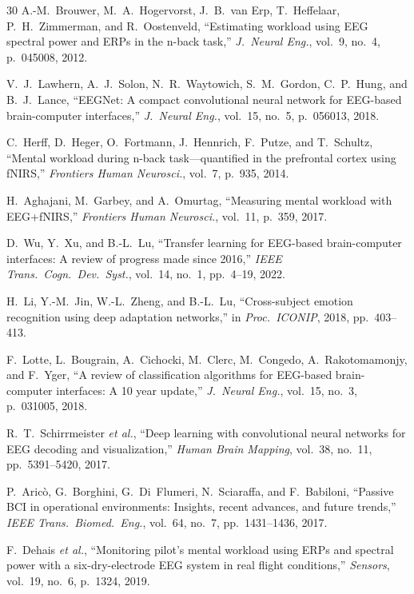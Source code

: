 \documentclass[conference]{IEEEtran}
\begin{document}
\begin{thebibliography}{30}
A.-M.~Brouwer, M.~A.~Hogervorst, J.~B.~van Erp, T.~Heffelaar, P.~H.~Zimmerman, and R.~Oostenveld, ``Estimating workload using EEG spectral power and ERPs in the n-back task,'' \emph{J.\ Neural Eng.}, vol.~9, no.~4, p.~045008, 2012.

V.~J.~Lawhern, A.~J.~Solon, N.~R.~Waytowich, S.~M.~Gordon, C.~P.~Hung, and B.~J.~Lance, ``EEGNet: A compact convolutional neural network for EEG-based brain-computer interfaces,'' \emph{J.\ Neural Eng.}, vol.~15, no.~5, p.~056013, 2018.

C.~Herff, D.~Heger, O.~Fortmann, J.~Hennrich, F.~Putze, and T.~Schultz, ``Mental workload during n-back task---quantified in the prefrontal cortex using fNIRS,'' \emph{Frontiers Human Neurosci.}, vol.~7, p.~935, 2014.

H.~Aghajani, M.~Garbey, and A.~Omurtag, ``Measuring mental workload with EEG+fNIRS,'' \emph{Frontiers Human Neurosci.}, vol.~11, p.~359, 2017.

D.~Wu, Y.~Xu, and B.-L.~Lu, ``Transfer learning for EEG-based brain-computer interfaces: A review of progress made since 2016,'' \emph{IEEE Trans.\ Cogn.\ Dev.\ Syst.}, vol.~14, no.~1, pp.~4--19, 2022.

H.~Li, Y.-M.~Jin, W.-L.~Zheng, and B.-L.~Lu, ``Cross-subject emotion recognition using deep adaptation networks,'' in \emph{Proc.\ ICONIP}, 2018, pp.~403--413.

F.~Lotte, L.~Bougrain, A.~Cichocki, M.~Clerc, M.~Congedo, A.~Rakotomamonjy, and F.~Yger, ``A review of classification algorithms for EEG-based brain-computer interfaces: A 10 year update,'' \emph{J.\ Neural Eng.}, vol.~15, no.~3, p.~031005, 2018.

R.~T.~Schirrmeister \emph{et al.}, ``Deep learning with convolutional neural networks for EEG decoding and visualization,'' \emph{Human Brain Mapping}, vol.~38, no.~11, pp.~5391--5420, 2017.

P.~Aric\`o, G.~Borghini, G.~Di~Flumeri, N.~Sciaraffa, and F.~Babiloni, ``Passive BCI in operational environments: Insights, recent advances, and future trends,'' \emph{IEEE Trans.\ Biomed.\ Eng.}, vol.~64, no.~7, pp.~1431--1436, 2017.

F.~Dehais \emph{et al.}, ``Monitoring pilot's mental workload using ERPs and spectral power with a six-dry-electrode EEG system in real flight conditions,'' \emph{Sensors}, vol.~19, no.~6, p.~1324, 2019.


\end{thebibliography}
\end{document}
